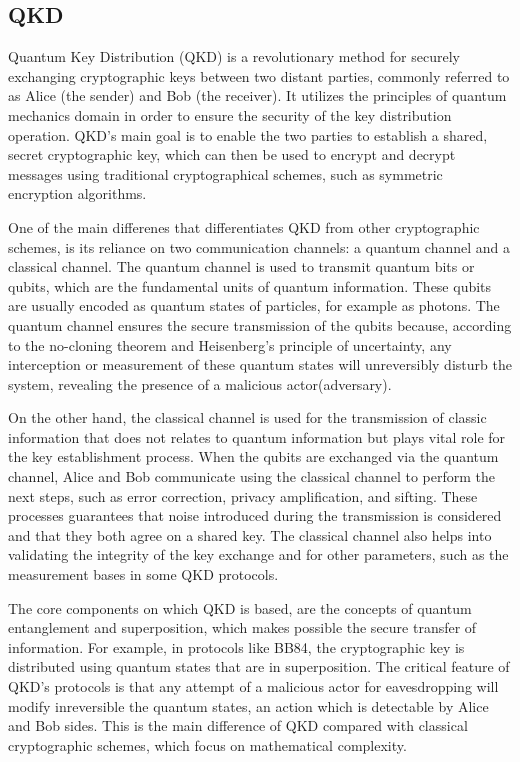 \documentclass[12pt]{ieeetj}
\begin{document}
		\subsection{QKD}

		Quantum Key Distribution (QKD) is a revolutionary method for securely exchanging cryptographic keys between two distant parties\cite{powergrid}, 
		commonly referred to as Alice (the sender) and Bob (the receiver). 
		It utilizes the principles of quantum mechanics domain in order to ensure the security of the key distribution operation. 
		QKD's main goal is to enable the two parties to establish a shared, secret cryptographic key, 
		which can then be used to encrypt and decrypt messages using traditional cryptographical schemes, such as symmetric encryption algorithms.

		One of the main differenes that differentiates QKD from other cryptographic schemes, 
		is its reliance on two communication channels: 
		a quantum channel and a classical channel. 
		The quantum channel is used to transmit quantum bits or qubits, 
		which are the fundamental units of quantum information. 
		These qubits are usually encoded as quantum states of particles, for example as photons. 
		The quantum channel ensures the secure transmission of the qubits because, 
		according to the no-cloning theorem and 
		Heisenberg's principle of uncertainty, 
		any interception or measurement of these quantum states 
		will unreversibly disturb the system, revealing the presence of a malicious actor(adversary).

		On the other hand, the classical channel is used for the transmission of classic information 
		that does not relates to quantum information but plays vital role for the key establishment process.
		When the qubits are exchanged via the quantum channel, Alice and Bob communicate using the classical channel
		to perform the next steps, such as error correction, privacy amplification, and sifting. 
		These processes guarantees that noise introduced during the transmission is considered 
		and that they both agree on a shared key.
		The classical channel also helps into validating the integrity of the key exchange
		and for other parameters, such as the measurement bases in some QKD protocols.

		The core components on which QKD is based, are the concepts of quantum entanglement and superposition,
		which makes possible the secure transfer of information. 
		For example, in protocols like BB84, the cryptographic key is distributed using quantum states
		that are in superposition. The critical feature of QKD's protocols is that any attempt of a malicious actor for
		eavesdropping will modify inreversible the quantum states, an action which is detectable by Alice and Bob sides.
		This is the main difference of QKD compared with classical cryptographic schemes, which focus on mathematical complexity. 
\end{document}

